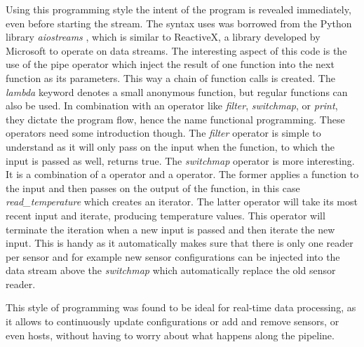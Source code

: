 Using this programming style the intent of the program is revealed immediately, even before starting the stream. The syntax uses was borrowed from the Python library \textit{aiostreams} \cite{aiostreams}, which is similar to ReactiveX, a library developed by Microsoft to operate on data streams. The interesting aspect of this code is the use of the pipe operator which inject the result of one function into the next function as its parameters. This way a chain of function calls is created. The \textit{lambda} keyword denotes a small anonymous function, but regular functions can also be used. In combination with an operator like \textit{filter}, \textit{switchmap}, or \textit{print}, they dictate the program flow, hence the name functional programming. These operators need some introduction though. The \textit{filter} operator is simple to understand as it will only pass on the input when the function, to which the input is passed as well, returns true. The \textit{switchmap} operator is more interesting. It is a combination of a  operator and a  operator. The former applies a function to the input and then passes on the output of the function, in this case \textit{read\_temperature} which creates an iterator. The latter operator will take its most recent input and iterate, producing temperature values. This operator will terminate the iteration when a new input is passed and then iterate the new input. This is handy as it automatically makes sure that there is only one reader per sensor and for example new sensor configurations can be injected into the data stream above the \textit{switchmap} which automatically replace the old sensor reader.

This style of programming was found to be ideal for real-time data processing, as it allows to continuously update configurations or add and remove sensors, or even hosts, without having to worry about what happens along the pipeline.

